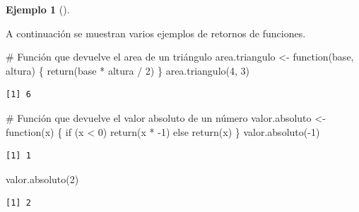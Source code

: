 \documentclass[
  a4paper,
]{scrreport}
\newenvironment{Shaded}{\begin{snugshade}}{\end{snugshade}}
\newcommand{\CommentTok}[1]{\textcolor[rgb]{0.37,0.37,0.37}{#1}}
\newcommand{\ControlFlowTok}[1]{\textcolor[rgb]{0.00,0.23,0.31}{#1}}
\newcommand{\DecValTok}[1]{\textcolor[rgb]{0.68,0.00,0.00}{#1}}
\newcommand{\FunctionTok}[1]{\textcolor[rgb]{0.28,0.35,0.67}{#1}}
\newcommand{\NormalTok}[1]{\textcolor[rgb]{0.00,0.23,0.31}{#1}}
\newcommand{\OtherTok}[1]{\textcolor[rgb]{0.00,0.23,0.31}{#1}}
\newcommand{\SpecialCharTok}[1]{\textcolor[rgb]{0.37,0.37,0.37}{#1}}
\theoremstyle{definition}
\theoremstyle{definition}
\newtheorem{example}{Ejemplo}[chapter]
\theoremstyle{remark}
\begin{document}
\leavevmode{}%
\begin{example}[]\label{exm-retorno-funciones}

A continuación se muestran varios ejemplos de retornos de funciones.

\begin{Shaded}
\begin{Highlighting}[]
\CommentTok{\# Función que devuelve el area de un triángulo}
\NormalTok{area.triangulo }\OtherTok{\textless{}{-}} \ControlFlowTok{function}\NormalTok{(base, altura) \{}
  \FunctionTok{return}\NormalTok{(base }\SpecialCharTok{*}\NormalTok{ altura }\SpecialCharTok{/} \DecValTok{2}\NormalTok{)}
\NormalTok{\}}
\FunctionTok{area.triangulo}\NormalTok{(}\DecValTok{4}\NormalTok{, }\DecValTok{3}\NormalTok{)}
\end{Highlighting}
\end{Shaded}

\begin{verbatim}
[1] 6
\end{verbatim}

\begin{Shaded}
\begin{Highlighting}[]
\CommentTok{\# Función que devuelve el valor absoluto de un número}
\NormalTok{valor.absoluto }\OtherTok{\textless{}{-}} \ControlFlowTok{function}\NormalTok{(x) \{}
  \ControlFlowTok{if}\NormalTok{ (x }\SpecialCharTok{\textless{}} \DecValTok{0}\NormalTok{)}
    \FunctionTok{return}\NormalTok{(x }\SpecialCharTok{*} \SpecialCharTok{{-}}\DecValTok{1}\NormalTok{)}
  \ControlFlowTok{else}
    \FunctionTok{return}\NormalTok{(x)}
\NormalTok{\}}
\FunctionTok{valor.absoluto}\NormalTok{(}\SpecialCharTok{{-}}\DecValTok{1}\NormalTok{)}
\end{Highlighting}
\end{Shaded}

\begin{verbatim}
[1] 1
\end{verbatim}

\begin{Shaded}
\begin{Highlighting}[]
\FunctionTok{valor.absoluto}\NormalTok{(}\DecValTok{2}\NormalTok{)}
\end{Highlighting}
\end{Shaded}

\begin{verbatim}
[1] 2
\end{verbatim}

\end{example}
\end{document}

